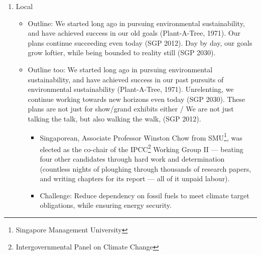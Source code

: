 \documentclass[oneside]{book}
\begin{document}
\begin{enumerate}
\begin{itemize}
\begin{itemize}
\begin{itemize}
                \item  The following year, the U.S. Congress approved legislation that could get the country close to reaching that goal. 
                \item The EU pledged to reduce emissions by at least 55 percent compared to 1990 levels by 2030.
                \item China said it aims to reach peak emissions before 2030.
            \end{itemize}
            \item Yet, global temperature will still rise 2\(^{\circ}\text{C}\) by 2100 even if countries fully implement their pledges for 2030 and beyond. In fact, even if the more than one hundred countries that have set or are considering net-zero targets follow through, it could be reduced to 1.8\(^{\circ}\text{C}\). However, to say that this is unrealistic would be a drastic understatement.
        \end{itemize}
    \end{itemize}
        \item Local
    \begin{itemize}
        \item Outline: We started long ago in pursuing environmental sustainability, and have achieved success in our old goals (Plant-A-Tree, 1971). Our plans continue succeeding even today (SGP 2012). Day by day, our goals grow loftier, while being bounded to reality still (SGP 2030).  
        \item Outline too: We started long ago in pursuing environmental sustainability, and have achieved success in our past pursuits of environmental sustainability (Plant-A-Tree, 1971). Unrelenting, we continue working towards new horizons even today (SGP 2030). These plans are not just for show/grand exhibits either / We are not just talking the talk, but also walking the walk, (SGP 2012). 
        \begin{itemize}
            \item Singaporean, Associate Professor Winston Chow from SMU\footnote{Singapore Management University}, was elected as the co-chair of the IPCC\footnote{Intergovernmental Panel on Climate Change
            } Working Group II --- beating four other candidates through hard work and determination \footnotesize(countless nights of ploughing through thousands of research papers, and writing chapters for its report --- all of it unpaid labour)\normalsize.
            \item Challenge: Reduce dependency on fossil fuels to meet climate target obligations, while ensuring energy security.

\end{itemize}
\end{itemize}
\end{enumerate}
\end{document}
